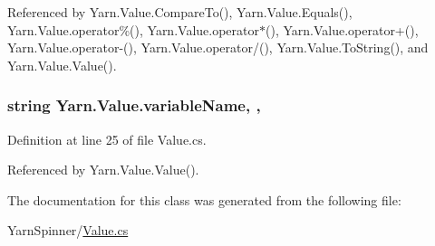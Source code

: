 Referenced by Yarn.\-Value.\-Compare\-To(), Yarn.\-Value.\-Equals(), Yarn.\-Value.\-operator\%(), Yarn.\-Value.\-operator$\ast$(), Yarn.\-Value.\-operator+(), Yarn.\-Value.\-operator-\/(), Yarn.\-Value.\-operator/(), Yarn.\-Value.\-To\-String(), and Yarn.\-Value.\-Value().

\hypertarget{a00165_a8ee2b09b7d28eaf97bf63c74d0023bfd}{
\subsubsection[{variable\-Name}]{\setlength{\rightskip}{0pt plus 5cm}string Yarn.\-Value.\-variable\-Name\hspace{0.3cm}{\ttfamily [get]}, {\ttfamily [set]}, {\ttfamily [package]}}}\label{a00165_a8ee2b09b7d28eaf97bf63c74d0023bfd}


Definition at line 25 of file Value.\-cs.



Referenced by Yarn.\-Value.\-Value().



The documentation for this class was generated from the following file\-:\begin{DoxyCompactItemize}
\item 
Yarn\-Spinner/\hyperlink{a00290}{Value.\-cs}\end{DoxyCompactItemize}
